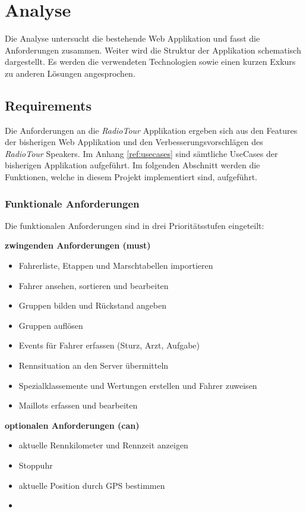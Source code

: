 \chapter{Analyse}
Die Analyse untersucht die bestehende Web Applikation und fasst die Anforderungen zusammen. Weiter wird die Struktur der Applikation schematisch dargestellt. Es werden die verwendeten Technologien sowie einen kurzen Exkurs zu anderen Lösungen angesprochen.

\section{Requirements}
Die Anforderungen an die \textit{RadioTour} Applikation ergeben sich aus den Features der bisherigen Web Applikation und den Verbesserungsvorschlägen des \textit{RadioTour} Speakers. Im Anhang \ref{ref:usecases} sind sämtliche UseCases der bisherigen Applikation aufgeführt. Im folgenden Abschnitt werden die Funktionen, welche in diesem Projekt implementiert sind, aufgeführt.

\subsection{Funktionale Anforderungen}
Die funktionalen Anforderungen sind in drei Prioritätsstufen eingeteilt:

\textbf{zwingenden Anforderungen (must)}
\begin{itemize}
\item Fahrerliste, Etappen und Marschtabellen importieren
\item Fahrer ansehen, sortieren und bearbeiten
\item Gruppen bilden und Rückstand angeben
\item Gruppen auflösen
\item Events für Fahrer erfassen (Sturz, Arzt, Aufgabe)
\item Rennsituation an den Server übermitteln
\item Spezialklassemente und Wertungen erstellen und Fahrer zuweisen
\item Maillots erfassen und bearbeiten

\end{itemize}


\textbf{optionalen Anforderungen (can)}
\begin{itemize}
\item aktuelle Rennkilometer und Rennzeit anzeigen
\item Stoppuhr
\item aktuelle Position durch GPS bestimmen
\item 
\end{itemize}


